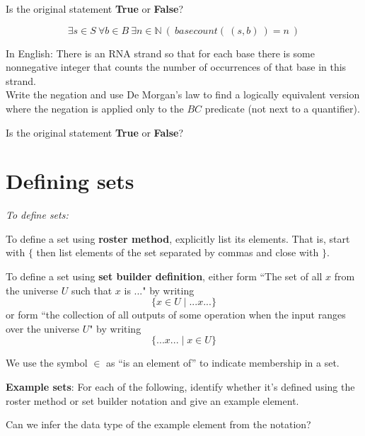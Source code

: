 \documentclass[12pt, oneside]{article}
\begin{document}
\vspace{60pt}


Is the original statement {\bf True} or {\bf False}?



\vfill



$$\exists s \in S ~\forall b \in B ~\exists n \in \mathbb{N} ~(~basecount(~(s,b)~) = n~)$$

In English: There is an RNA strand so that for each base there is some nonnegative
integer that counts the number of occurrences of that base in this strand.\\

Write the negation and use De Morgan's law to find a 
logically equivalent version where the negation is applied only to the 
$BC$ predicate (not next to a quantifier).

\vspace{60pt}


Is the original statement {\bf True} or {\bf False}?



\vfill
 \vfill
\section*{Defining sets}


{\it To define sets:}

To define a set using {\bf roster method}, explicitly list its elements. That is,
start with $\{$ then list elements of 
the set separated by commas and close with $\}$.

\vfill

To define a set using {\bf set builder definition}, either form 
``The set of all $x$ from the universe $U$ such that $x$ is ..." by writing
\[\{x \in U \mid ...x... \}\]
or form ``the collection of all outputs of some operation when the input ranges over the universe $U$"
by writing
\[\{ ...x... \mid x\in U \}\]

\vfill

We use the symbol $\in$ as ``is an element of'' to indicate membership in a set.\\

\newpage 

{\bf Example sets}: For each of the following, identify whether it's defined using the roster method
or set builder notation and give an example element.

Can we infer the data type of the example element from the notation?
\end{document}
